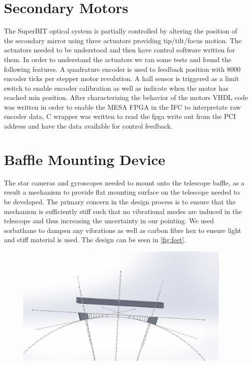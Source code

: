 \section{Secondary Motors}
The SuperBIT optical system is partially controlled by altering the position of the secondary mirror using three actuators providing tip/tilt/focus motion. The actuators needed to be understood and then have control software written for them. In order to understand the actuators we ran some tests and found the following features. A quadrature encoder is used to feedback position with 8000 encoder ticks per stepper motor revolution. A hall sensor is triggered as a limit switch to enable encoder calibration as well as indicate when the motor has reached min position. After characterizing the behavior of the motors VHDL code was written in order to enable the MESA FPGA in the IFC to interpretate raw encoder data, C wrapper was written to read the fpga write out from the PCI address and have the data available for control feedback.

\section{Baffle Mounting Device}
The star cameras and gyroscopes needed to mount onto the telescope baffle, as a result a mechanism to provide flat mounting surface on the telescope needed to be developed. The primary concern in the design process is to ensure that the mechanism is sufficiently stiff such that no vibrational modes are induced in the telescope and thus increasing the uncertainty in our pointing. We used sorbathane to dampen any vibrations as well as carbon fibre hex to ensure light and stiff material is used. The design can be seen in \autoref{fig:feet}.

\begin{figure}
    \begin{small}
        \begin{center}
            \includegraphics[width=0.95\textwidth]{Hardware/figs/baffle_mount.png}
        \end{center}
        \caption{}
        \label{fig:feet}
    \end{small}
\end{figure}


